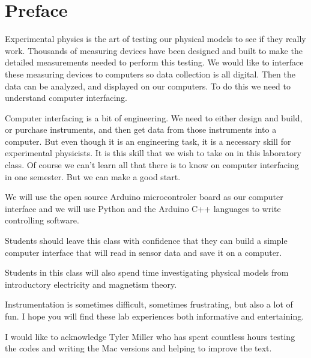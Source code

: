 \chapter*{Preface}
Experimental physics is the art of testing our physical models to see if they really work. Thousands of measuring devices have been designed and built to make the detailed measurements needed to perform this testing. We would like to interface these measuring devices to computers so data collection is all digital. Then the data can be analyzed, and displayed on our computers. To do this we need to understand computer interfacing.

Computer interfacing is a bit of engineering. We need to either design and build, or purchase instruments, and then get data from those instruments into a computer. But even though it is an engineering task, it is a necessary skill for experimental physicists. It is this skill that we wish to take on in this laboratory class. Of course we can't learn all that there is to know on computer interfacing in one semester. But we can make a good start.

We will use the open source Arduino microcontroler board as our computer interface and we will use Python and the Arduino C++ languages to write controlling software.

Students should leave this class with confidence that they can build a simple computer interface that will read in sensor data and save it on a computer.

Students in this class will also spend time investigating physical models from introductory electricity and magnetism theory.

Instrumentation is sometimes difficult, sometimes frustrating, but also a lot of fun. I hope you will find these lab experiences both informative and entertaining. 

I would like to acknowledge Tyler Miller who has spent countless hours testing the codes and writing the Mac versions and helping to improve the text. 
